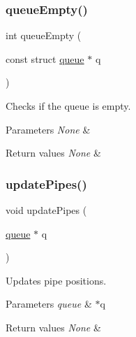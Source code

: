 \subsubsection{\texorpdfstring{queue\+Empty()}{queueEmpty()}}
{\footnotesize\ttfamily int queue\+Empty (\begin{DoxyParamCaption}\item[{const struct \hyperlink{structqueue}{queue} $\ast$}]{q }\end{DoxyParamCaption})}



Checks if the queue is empty. 


\begin{DoxyParams}{Parameters}
{\em None} & \\
\hline
\end{DoxyParams}

\begin{DoxyRetVals}{Return values}
{\em None} & \\
\hline
\end{DoxyRetVals}
\mbox{\label{group___queue___structure_gaa67785a5fa2b77b9cb310adba3fd18af}} 
\subsubsection{\texorpdfstring{update\+Pipes()}{updatePipes()}}
{\footnotesize\ttfamily void update\+Pipes (\begin{DoxyParamCaption}\item[{\hyperlink{structqueue}{queue} $\ast$}]{q }\end{DoxyParamCaption})}



Updates pipe positions. 


\begin{DoxyParams}{Parameters}
{\em queue} & $\ast$q \\
\hline
\end{DoxyParams}

\begin{DoxyRetVals}{Return values}
{\em None} & \\
\hline
\end{DoxyRetVals}
